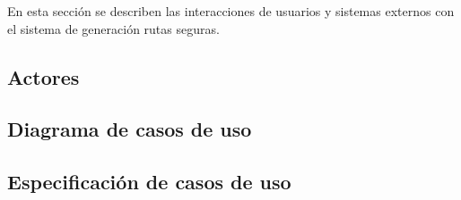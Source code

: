 En esta sección se describen las interacciones de usuarios y sistemas externos con el sistema de generación rutas seguras.

\subsection{Actores}

\subsection{Diagrama de casos de uso}

\subsection{Especificación de casos de uso}
